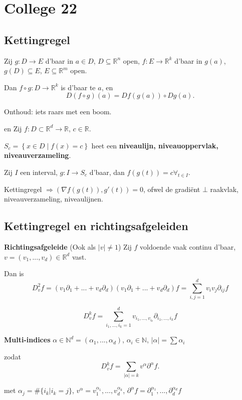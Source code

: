 \documentclass[a4paper]{exam}
\theoremstyle{definition}
\newcommand{\naturals}{\mathbb{N}}
\newcommand{\reals}{\mathbb{R}}
\begin{document}
	\newpage
	\section{College 22}
		\subsection{Kettingregel}
			\theorem Zij $g:D \to E$ d'baar in $a \in D$, $D \subseteq \reals^n$ open, $f:E \to \reals^k$ d'baar in $g(a)$, $g(D) \subseteq E$, $E \subseteq \reals^m$ open.
			
			Dan $f\circ g:D\to \reals^k$ is d'baar te $a$, en \[ D(f \circ g)(a) = Df(g(a))\circ Dg(a). \]
			
			Onthoud: iets raars met een boom.
			
			\gevolg en  Zij $f:D \subset \reals^d \to \reals$, $c \in \reals$. 
			
			$S_c = \left\{ x\in D \middle| f(x)=c \right\}$ heet een \textbf{niveaulijn, niveauoppervlak, niveauverzameling}.
			
			Zij $I$ een interval, $g: I\to S_c$ d'baar, dan $f(g(t))=c \forall_{t \in I}$.
			
			\opm Kettingregel $\Rightarrow (\nabla f(g(t)),g'(t)) = 0$, ofwel de gradi\"ent $\bot$ raakvlak, niveauverzameling, niveaulijnen.
			
		\subsection{Kettingregel en richtingsafgeleiden}
			
			 \textbf{Richtingsafgeleide} (Ook als $|v|\neq 1$)
			Zij $f$ voldoende vaak continu d'baar, $v=(v_1,...,v_d) \in \reals^d$ vast.
			
			Dan is \[ D_v^2 f = (v_1 \partial_1 + ... + v_d \partial_d)(v_1 \partial_1 + ... + v_d \partial_d)f = \sum_{i,j=1}^{d} v_i v_j \partial_{ij}f \]
			
			\[ D_v^k f = \sum_{i_1,...,i_k=1}^{d} v_{{i_1},...,v_{i_k}} \partial_{i_1,...,i_k} f \]
			
			\nota \textbf{Multi-indices} $ \alpha \in \naturals^d = (\alpha_1 ,..., \alpha_d) $, $\alpha_i \in \naturals$, $ |\alpha| = \sum \alpha_i $
			
			zodat \[ D_v^k f = \sum_{|\alpha|=k} v^\alpha \partial^\alpha f. \]
			
			met $ \alpha_j = \#\{i_k | i_k = j\} $, $ v^\alpha = v_1^{\alpha_1} ,..., v_d^{\alpha_k} $, $ \partial^\alpha f = \partial_1^{\alpha_1},...,\partial_d^{\alpha_d} f $
			
\end{document}
